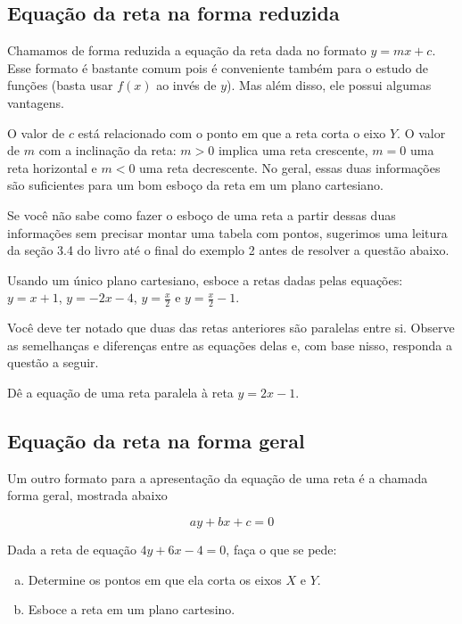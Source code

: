 \documentclass[main_estudante.tex]{subfiles}
\begin{document}
\subsection*{Equação da reta na forma reduzida}

Chamamos de forma reduzida a equação da reta dada no formato $y=mx+c$. Esse formato é bastante comum pois é conveniente também para o estudo de funções (basta usar $f(x)$ ao invés de $y$). Mas além disso, ele possui algumas vantagens.

O valor de $c$ está relacionado com o ponto em que a reta corta o eixo $Y$. O valor de $m$ com a inclinação da reta: $m>0$ implica uma reta crescente, $m=0$ uma reta horizontal e $m<0$ uma reta decrescente. No geral, essas duas informações são suficientes para um bom esboço da reta em um plano cartesiano.

Se você não sabe como fazer o esboço de uma reta a partir dessas duas informações sem precisar montar uma tabela com pontos, sugerimos uma leitura da seção 3.4 do livro  até o final do exemplo 2 antes de resolver a questão abaixo.

\begin{questao}
Usando um único plano cartesiano, esboce a retas dadas pelas equações: $y=x+1$, $y=-2x-4$, $y=\frac{x}{2}$ e $y=\frac{x}{2}-1$.
\end{questao}

Você deve ter notado que duas das retas anteriores são paralelas entre si. Observe as semelhanças e diferenças entre as equações delas e, com base nisso, responda a questão a seguir.

\begin{questao}
Dê a equação de uma reta paralela à reta $y=2x-1$.
\end{questao}

\subsection*{Equação da reta na forma geral}

Um outro formato para a apresentação da equação de uma reta é a chamada forma geral, mostrada abaixo

$$ay+bx+c=0$$

\begin{questao}
Dada a reta de equação $4y+6x-4=0$, faça o que se pede:
\begin{enumerate}[a)]
\item Determine os pontos em que ela corta os eixos $X$ e $Y$.
\item Esboce a reta em um plano cartesino.
\end{enumerate} 
\end{questao}
\end{document}
